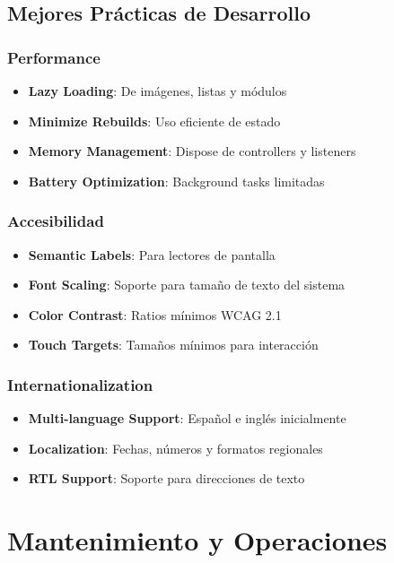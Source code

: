 \documentclass[12pt]{article}
\begin{document}
\subsection{Mejores Prácticas de Desarrollo}

\subsubsection{Performance}
\begin{itemize}
    \item \textbf{Lazy Loading}: De imágenes, listas y módulos
    \item \textbf{Minimize Rebuilds}: Uso eficiente de estado
    \item \textbf{Memory Management}: Dispose de controllers y listeners
    \item \textbf{Battery Optimization}: Background tasks limitadas
\end{itemize}

\subsubsection{Accesibilidad}
\begin{itemize}
    \item \textbf{Semantic Labels}: Para lectores de pantalla
    \item \textbf{Font Scaling}: Soporte para tamaño de texto del sistema
    \item \textbf{Color Contrast}: Ratios mínimos WCAG 2.1
    \item \textbf{Touch Targets}: Tamaños mínimos para interacción
\end{itemize}

\subsubsection{Internationalization}
\begin{itemize}
    \item \textbf{Multi-language Support}: Español e inglés inicialmente
    \item \textbf{Localization}: Fechas, números y formatos regionales
    \item \textbf{RTL Support}: Soporte para direcciones de texto
\end{itemize}

\section{Mantenimiento y Operaciones}
\label{sec:mantenimiento}
\end{document}
